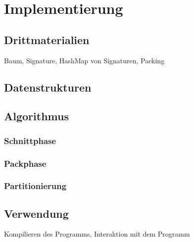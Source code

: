 
\chapter{Implementierung}\label{chapter:implementierung}
\section{Drittmaterialien}
Baum, Signature, HashMap von Signaturen, Packing
\section{Datenstrukturen}
\section{Algorithmus}
\subsection{Schnittphase}
\subsection{Packphase}
\subsection{Partitionierung}
\section{Verwendung}
Kompilieren des Programms, Interaktion mit dem Programm
